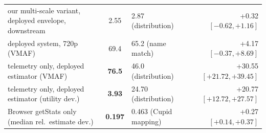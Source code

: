 \begin{table}[t]
\begin{threeparttable}
\begin{tabular}{@{}l c l r@{}}
\quad our multi-scale variant, deployed envelope, downstream & 2.55 & 2.87 (distribution) & +0.32 $[-0.62, +1.16]$ \\
\quad deployed system, 720p (VMAF) & 69.4 & 65.2 (name match) & +4.17 $[-0.37, +8.69]$ \\
\quad telemetry only, deployed estimator (VMAF) & \cellcolor{favour}\bfseries 76.5 & 46.0 (distribution) & +30.55 $[+21.72, +39.45]$ \\
\quad telemetry only, deployed estimator (utility dev.) & \cellcolor{favour}\bfseries 3.93 & 24.70 (distribution) & +20.77 $[+12.72, +27.57]$ \\
Browser getStats only (median rel.\ estimate dev.) & \cellcolor{favour}\bfseries 0.197 & 0.463 (Cupid mapping) & +0.27 $[+0.14, +0.37]$ \\
\bottomrule
\end{tabular}

\end{threeparttable}
\end{table}
